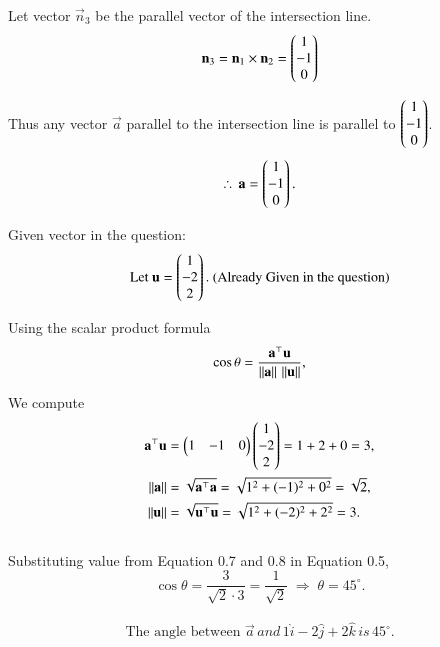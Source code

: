 \documentclass[journal]{IEEEtran}
\begin{document}
Let vector $\vec{n}_3$ be the parallel vector of the intersection line.
\begin{equation}
    \mathbf{n}_3 = \mathbf{n}_1 \times \mathbf{n}_2 = \begin{pmatrix}1 \\ -1 \\ 0\end{pmatrix}
\end{equation}


 Thus any vector $\vec{a}$ parallel to the intersection line is parallel to $\begin{pmatrix}1 \\ -1 \\ 0\end{pmatrix}$.
\begin{equation}
\therefore \, \mathbf{a} = \begin{pmatrix}1 \\ -1 \\ 0\end{pmatrix}.
\end{equation}

Given vector in the question:
\begin{equation}
\text{Let }
\mathbf{u} = \begin{pmatrix}1 \\ -2 \\ 2\end{pmatrix}. \text{ (Already Given in the question)}
\end{equation}

\newpage

Using the scalar product formula
\begin{equation}
\cos \theta = \frac{\mathbf{a}^{\top}\mathbf{u}}{ \left\lVert\mathbf{a}\right\rVert \,  \left\lVert\mathbf{u}\right\rVert},
\end{equation}

We compute
\begin{align}
\mathbf{a}^{\top}\mathbf{u} &= \begin{pmatrix}1 & -1 & 0\end{pmatrix}\begin{pmatrix}1 \\ -2 \\ 2\end{pmatrix} = 1 + 2 + 0 = 3, \\
 \left\lVert\mathbf{a}\right\rVert &= \sqrt{\mathbf{a}^{\top}\mathbf{a}} = \sqrt{1^{2}+(-1)^{2}+0^{2}} = \sqrt{2}, \\
 \left\lVert\mathbf{u}\right\rVert &= \sqrt{\mathbf{u}^{\top}\mathbf{u}}=\sqrt{1^{2}+(-2)^{2}+2^{2}} = 3.
\end{align}\\

Substituting value from Equation 0.7 and 0.8 in Equation 0.5,
\begin{equation}
\cos \theta = \frac{3}{\sqrt{2}\cdot 3} = \frac{1}{\sqrt{2}}
\;\Rightarrow\;
\theta = 45^{\circ}.
\end{equation}

\begin{align}
  \boxed{\text{The angle between } \vec{a} \, and \, 1\hat{i} -2\hat{j}+2\hat{k} \, is \, 45^{\circ}.}  
\end{align}
  
\end{document}
